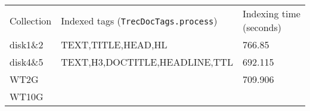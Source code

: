 \begin{longtable}[]{@{}lll@{}}
\toprule
\begin{minipage}[t]{0.30\columnwidth}\raggedright\strut
Collection
\strut\end{minipage} &
\begin{minipage}[t]{0.30\columnwidth}\raggedright\strut
Indexed tags (\texttt{TrecDocTags.process})
\strut\end{minipage} &
\begin{minipage}[t]{0.30\columnwidth}\raggedright\strut
Indexing time (seconds)
\strut\end{minipage}\tabularnewline
\begin{minipage}[t]{0.30\columnwidth}\raggedright\strut
disk1\&2
\strut\end{minipage} &
\begin{minipage}[t]{0.30\columnwidth}\raggedright\strut
TEXT,TITLE,HEAD,HL
\strut\end{minipage} &
\begin{minipage}[t]{0.30\columnwidth}\raggedright\strut
766.85
\strut\end{minipage}\tabularnewline
\begin{minipage}[t]{0.30\columnwidth}\raggedright\strut
disk4\&5
\strut\end{minipage} &
\begin{minipage}[t]{0.30\columnwidth}\raggedright\strut
TEXT,H3,DOCTITLE,HEADLINE,TTL
\strut\end{minipage} &
\begin{minipage}[t]{0.30\columnwidth}\raggedright\strut
692.115
\strut\end{minipage}\tabularnewline
\begin{minipage}[t]{0.30\columnwidth}\raggedright\strut
WT2G
\strut\end{minipage} &
\begin{minipage}[t]{0.30\columnwidth}\raggedright\strut
~
\strut\end{minipage} &
\begin{minipage}[t]{0.30\columnwidth}\raggedright\strut
709.906
\strut\end{minipage}\tabularnewline
\begin{minipage}[t]{0.30\columnwidth}\raggedright\strut
WT10G
\strut\end{minipage} &
\begin{minipage}[t]{0.30\columnwidth}\raggedright\strut
~
\strut\end{minipage} &
\begin{minipage}[t]{0.30\columnwidth}\raggedright\strut

\end{minipage}
\end{longtable}
